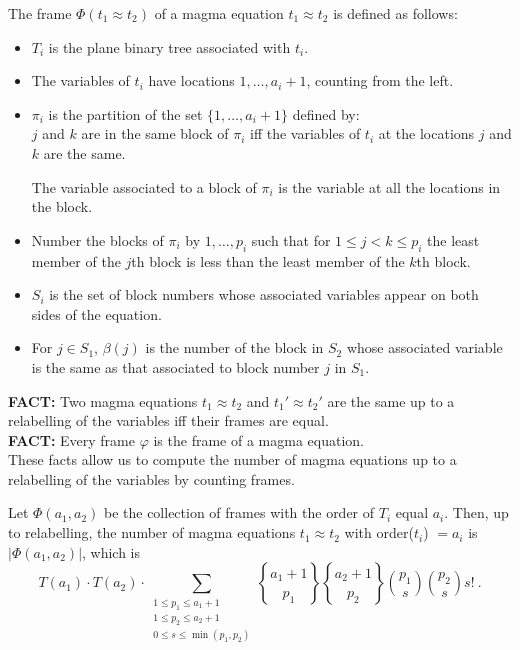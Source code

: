 \documentclass[12pt]{amsart}
\begin{document}
The frame $\Phi(t_1 \approx t_2)$ of a magma equation $t_1 \approx t_2$ is defined as follows:
\begin{itemize}
\item $T_i$ is the plane binary tree associated with $t_i$.
\item The variables of $t_i$ have locations $1,\ldots, a_i+1$, counting from the left.
\item $\pi_i$ is the partition of the set $\{1,\ldots,a_i + 1\}$ defined by: \\
$j$ and $k$ are in
the same block of $\pi_i$ iff the variables of $t_i$ at the locations $j$ and $k$ are the same.

The variable associated to a block of $\pi_i$ is the variable at all the locations in the block.
\item 
Number the blocks of $\pi_i$ by $1,\ldots,p_i$ such that for $1 \le j<k \le p_i$ the least member of the
$j$th block is less than the least member of the $k$th block.
\item
$S_i$ is the set of block numbers whose associated variables appear on both sides of the equation.
\item
For $j \in S_1$, $\beta(j)$ is the number of the block in $S_2$ whose associated variable is the same as that associated to block number $j$ in $S_1$. 
\end{itemize}

{\bf FACT:} Two magma equations $t_1 \approx t_2$ and $t_1' \approx t_2'$ are the same up to a 
relabelling of the variables iff their frames are equal.\\

{\bf FACT:} Every frame $\varphi$ is the frame of a magma equation.\\

These facts allow us to compute the number of magma equations up to a relabelling of the variables 
by counting frames.

Let $\Phi(a_1,a_2)$ be the collection of frames with the order of $T_i$ equal $a_i$. 
Then, up to relabelling, the number of magma equations $t_1 \approx t_2$ 
with order($t_i$) $= a_i$ is $|\Phi(a_1,a_2)|$, 
which is
\begin{equation}\label{a1noteqa2}
T(a_1)\cdot T(a_2)\cdot \sum_{\substack{1 \le p_1 \le a_1+1\\ 1 \le p_2 \le a_2+1\\0\le s \le \min(p_1,p_2)}} 
{a_1+1 \brace p_1} {a_2+1 \brace p_2} {p_1 \choose s} {p_2\choose s} s! \ .
\end{equation}
\end{document}
